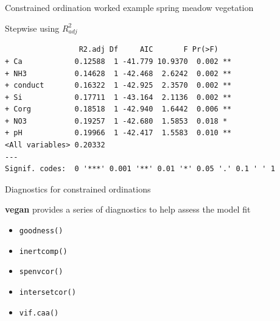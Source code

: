 \documentclass[10pt,ignorenonframetext,compress, aspectratio=169]{beamer}
\newenvironment{Shaded}{\begin{snugshade}}{\end{snugshade}}
\newcommand{\KeywordTok}[1]{\textcolor[rgb]{0.13,0.29,0.53}{\textbf{{#1}}}}
\newcommand{\DataTypeTok}[1]{\textcolor[rgb]{0.13,0.29,0.53}{{#1}}}
\newcommand{\StringTok}[1]{\textcolor[rgb]{0.31,0.60,0.02}{{#1}}}
\newcommand{\OtherTok}[1]{\textcolor[rgb]{0.56,0.35,0.01}{{#1}}}
\newcommand{\NormalTok}[1]{{#1}}
\begin{document}
\begin{frame}[fragile]{Constrained ordination worked example \textbar{}
spring meadow vegetation}

Stepwise using \(R^2_{adj}\)

\scriptsize

\begin{Shaded}
\end{Shaded}

\begin{verbatim}
                 R2.adj Df     AIC       F Pr(>F)   
+ Ca            0.12588  1 -41.779 10.9370  0.002 **
+ NH3           0.14628  1 -42.468  2.6242  0.002 **
+ conduct       0.16322  1 -42.925  2.3570  0.002 **
+ Si            0.17711  1 -43.164  2.1136  0.002 **
+ Corg          0.18518  1 -42.940  1.6442  0.006 **
+ NO3           0.19257  1 -42.680  1.5853  0.018 * 
+ pH            0.19966  1 -42.417  1.5583  0.010 **
<All variables> 0.20332                             
---
Signif. codes:  0 '***' 0.001 '**' 0.01 '*' 0.05 '.' 0.1 ' ' 1
\end{verbatim}

\normalsize

\end{frame}

\begin{frame}{Diagnostics for constrained ordinations}

\textbf{vegan} provides a series of diagnostics to help assess the model
fit

\begin{itemize}
\itemsep1pt\parskip0pt
\item
  \texttt{goodness()}
\item
  \texttt{inertcomp()}
\item
  \texttt{spenvcor()}
\item
  \texttt{intersetcor()}
\item
  \texttt{vif.caa()}
\end{itemize}

\end{frame}
\end{document}
